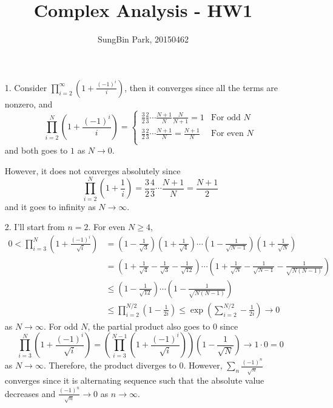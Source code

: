 \documentclass{article}
\begin{document}
\title{Complex Analysis - HW1}
\author{SungBin Park, 20150462} 

\maketitle
\begin{enumerate}
\item[1.] Consider $\prod_{i=2}^\infty \left(1+\frac{(-1)^i}{i}\right)$, then it converges since all the terms are nonzero, and
\begin{equation*}
\prod_{i=2}^N \left(1+\frac{(-1)^i}{i}\right)=\begin{cases}
\frac{3}{2}\frac{2}{3}\cdots\frac{N+1}{N}\frac{N}{N+1}=1 & \text{For odd }N \\
\frac{3}{2}\frac{2}{3}\cdots\frac{N+1}{N}=\frac{N+1}{N} & \text{For even }N \\
\end{cases}
\end{equation*}
and both goes to $1$ as $N\rightarrow 0$.

However, it does not converges absolutely since
\begin{equation*}
\prod_{i=2}^N \left(1+\frac{1}{i}\right)=\frac{3}{2}\frac{4}{3}\cdots\frac{N+1}{N}=\frac{N+1}{2}
\end{equation*}
and it goes to infinity as $N\rightarrow \infty$.
\item[2.] I'll start from $n=2$. For even $N\geq 4$,
\begin{equation*}
\begin{split}
0<\prod_{i=3}^N \left(1+\frac{(-1)^i}{\sqrt{i}}\right)&=\left(1-\frac{1}{\sqrt{3}}\right)\left(1+\frac{1}{\sqrt{4}}\right)\cdots \left(1-\frac{1}{\sqrt{N-1}}\right)\left(1+\frac{1}{\sqrt{N}}\right) \\
&= \left(1+\frac{1}{\sqrt{4}}-\frac{1}{\sqrt{3}}-\frac{1}{\sqrt{12}}\right)\cdots\left(1+\frac{1}{\sqrt{N}}-\frac{1}{\sqrt{N-1}}-\frac{1}{\sqrt{N(N-1)}}\right) \\
&\leq \left(1-\frac{1}{\sqrt{12}}\right)\cdots\left(1-\frac{1}{\sqrt{N(N-1)}}\right)\\
&\leq \prod_{i=2}^{N/2} \left(1-\frac{1}{2i}\right)\leq \exp\left(\sum\limits_{i=2}^{N/2} -\frac{1}{2i}\right)\rightarrow 0
\end{split}
\end{equation*}
as $N\rightarrow \infty$. For odd $N$, the partial product also goes to $0$ since 
\begin{equation*}
\prod_{i=3}^N \left(1+\frac{(-1)^i}{\sqrt{i}}\right) = \left(\prod_{i=3}^{N-1} \left(1+\frac{(-1)^i}{\sqrt{i}}\right)\right)\left(1-\frac{1}{\sqrt{N}}\right)\rightarrow 1\cdot 0 =0
\end{equation*}
as $N\rightarrow \infty$. Therefore, the product diverges to $0$. However, $\sum\limits_n \frac{(-1)^n}{\sqrt{n}}$ converges since it is alternating sequence such that the absolute value decreases and $\frac{(-1)^n}{\sqrt{n}}\rightarrow 0$ as $n\rightarrow \infty$.


\end{enumerate}
\end{document}
